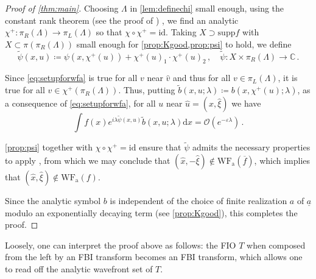 \documentclass[
	fontsize=11pt, 
	twoside=false, 
	abstract=true, 
	a4paper,
]{scrartcl}
\newcommand{\eps}{\varepsilon}
\newcommand{\sem}{\setminus\{0\}}
\newcommand{\RR}{\mathbb{R}}
\newcommand{\CC}{\mathbb{C}}
\newcommand{\dd}{\mathrm{d}}
\newcommand{\supp}{\mathrm{supp}}
\newcommand{\td}[1]{\tilde{#1}}
\newcommand{\id}{\mathrm{id}}
\newcommand{\wf}{\mathrm{WF}_{\mathrm{a}}}
\newcommand{\ud}[1]{\underline{#1}}
\begin{document}
\begin{proof}[Proof of \cref{thm:main}]
	Choosing $\Lambda$ in \cref{lem:definechi} small enough, using the constant rank theorem (see the proof of \cite[Thm.~4.26]{zbMATH06034615})%
	, we find an analytic $\chi^+ \colon \pi_R(\Lambda) \to \pi_L(\Lambda)$ so that $\chi \circ \chi^+ = \id$. Taking $X\supset \supp f$ with $X \subset \pi(\pi_R(\Lambda))$ small enough for \cref{prop:Kgood,prop:psi} to hold, we define
	\[
		\td{\psi}(x, u) \coloneqq \psi(x,\chi^+(u)) + \chi^+(u)_1\cdot \chi^+(u)_2\,,\quad \td{\psi} \colon X \times \pi_R(\Lambda) \to \CC\,.
	\]
	
	Since \cref{eq:setupforwfa} is true for all $v$ near $\hat v$ and thus for all $v\in \pi_L(\Lambda)$, it is true for all $v \in \chi^+(\pi_R(\Lambda))$. Thus, putting $\td{b}(x,u;\lambda) \coloneqq b(x,\chi^+(u);\lambda)$, as a consequence of \cref{eq:setupforwfa}, for all $u$ near $\hat u = (\hat x,\hat \xi)$ we have 
	\[
		\int f(x) e^{i\lambda\td{\psi}(x,u)}\td{b}(x,u;\lambda) \dd x = \mathcal{O}(e^{-\eps\lambda})\,.
	\]

	\cref{prop:psi} together with $\chi\circ\chi^+=\id$ ensure that $\td{\psi}$ admits the necessary properties to apply \cite[Def.~6.1]{AST_1982__95__R3_0}, from which we may conclude that $(\hat x, -\hat \xi) \not\in \wf(\overline{f})$, which implies that $(\hat x, \hat \xi)\not\in\wf(f)$.

	Since the analytic symbol $b$ is independent of the choice of finite realization $a$ of $\ud{a}$ modulo an exponentially decaying term (see \cref{prop:Kgood}), this completes the proof.
\end{proof}
Loosely, one can interpret the proof above as follows: the FIO $T$ when composed from the left by an FBI transform becomes an FBI transform, which allows one to read off the analytic wavefront set of $T$.
\end{document}
